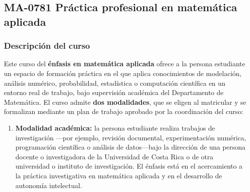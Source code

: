\newpage
\subsection*{MA-0781 Práctica profesional en matemática aplicada}

\hypertarget{MA0781Aplicada}{}
\begin{refsection}
\begin{table}[H]
\end{table}

\subsubsection*{Descripción del curso}

Este curso del \textbf{énfasis en matemática aplicada} ofrece a la persona estudiante un espacio de formación práctica en el que aplica conocimientos de modelación, análisis numérico, probabilidad, estadística o computación científica en un entorno real de trabajo, bajo supervisión académica del Departamento de Matemática. El curso admite \textbf{dos modalidades}, que se eligen al matricular y se formalizan mediante un plan de trabajo aprobado por la coordinación del curso:

\begin{enumerate}
\item \textbf{Modalidad académica:} la persona estudiante realiza trabajos de investigación ---por ejemplo, revisión documental, experimentación numérica, programación científica o análisis de datos---bajo la dirección de una persona docente o investigadora de la Universidad de Costa Rica o de otra universidad o instituto de investigación. El énfasis está en el acercamiento a la práctica investigativa en matemática aplicada y en el desarrollo de autonomía intelectual.


\end{enumerate}
\end{refsection}
